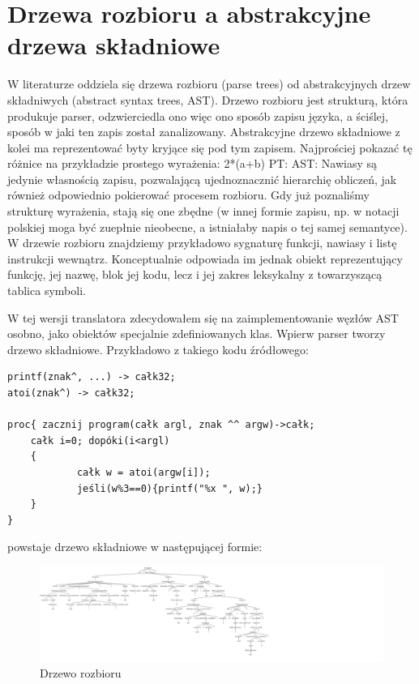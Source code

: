 \section{Drzewa rozbioru a abstrakcyjne drzewa składniowe}
W literaturze oddziela się drzewa rozbioru (parse trees) od abstrakcyjnych drzew składniwych (abstract syntax trees, AST).\cite{DRAGON_BOOK} Drzewo rozbioru jest strukturą, która produkuje parser, odzwierciedla ono więc ono sposób zapisu języka, a ściślej, sposób w jaki ten zapis został zanalizowany. Abstrakcyjne drzewo składniowe z kolei ma reprezentować byty kryjące się pod tym zapisem. Najprościej pokazać tę różnice na przykładzie prostego wyrażenia:
2*(a+b)
PT:
AST:
Nawiasy są jedynie własnością zapisu, pozwalającą ujednoznacznić hierarchię obliczeń, jak również odpowiednio pokierować procesem rozbioru. Gdy już poznaliśmy strukturę wyrażenia, stają się one zbędne (w innej formie zapisu, np. w notacji polskiej moga być zuepłnie nieobecne, a istniałaby napis o tej samej semantyce). W drzewie rozbioru znajdziemy przykładowo sygnaturę funkcji, nawiasy i listę instrukcji wewnątrz. Konceptualnie odpowiada im jednak obiekt reprezentujący funkcję, jej nazwę, blok jej kodu, lecz i jej zakres leksykalny z towarzyszącą tablica symboli.

W tej wersji translatora zdecydowałem się na zaimplementowanie węzłów AST osobno, jako obiektów specjalnie zdefiniowanych klas. Wpierw parser tworzy drzewo składniowe. Przykładowo z takiego kodu źródłowego:

\begin{lstlisting}
printf(znak^, ...) -> całk32;
atoi(znak^) -> całk32;

proc{ zacznij program(całk argl, znak ^^ argw)->całk;
	całk i=0; dopóki(i<argl)
	{
    		całk w = atoi(argw[i]);
    		jeśli(w%3==0){printf("%x ", w);}
	}
}
\end{lstlisting}
powstaje drzewo składniowe w następującej formie:
\begin{figure}[h]
    \centering
    \includegraphics[width=1.6\textwidth]{images/1.progmain/prezifelsePT1.png}
    \caption{Drzewo rozbioru}
\end{figure}

